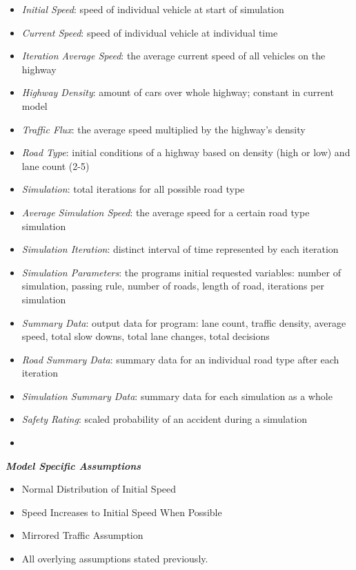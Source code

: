 \documentclass{amsart}
\begin{document}
\begin{itemize}
	\item \textit{Initial Speed}: speed of individual vehicle at start of simulation
	\item \textit{Current Speed}: speed of individual vehicle at individual time	
	\item \textit{Iteration Average Speed}: the average current speed of all vehicles on the highway
	\item \textit{Highway Density}: amount of cars over whole highway; constant in current model
	\item \textit{Traffic Flux}: the average speed multiplied by the highway's density
	\item \textit{Road Type}: initial conditions of a highway based on density (high or low) and lane count (2-5)
	\item \textit{Simulation}: total iterations for all possible road type	
	\item \textit{Average Simulation Speed}: the average speed for a certain road type simulation
	\item \textit{Simulation Iteration}: distinct interval of time represented by each iteration
	\item \textit{Simulation Parameters}: the programs initial requested variables: number of simulation, passing rule, number of roads, length of road, iterations per simulation
	\item \textit{Summary Data}: output data for program: lane count, traffic density, average speed, total slow downs, total lane changes, total decisions
	\item \textit{Road Summary Data}: summary data for an individual road type after each iteration
	\item \textit{Simulation Summary Data}: summary data for each simulation as a whole
	\item \textit{Safety Rating}: scaled probability of an accident during a simulation
	\item \
\end{itemize}
	
\textit{\textbf{Model Specific Assumptions}}

	\begin{itemize}
	\item Normal Distribution of Initial Speed
	\item Speed Increases to Initial Speed When Possible
	\item Mirrored Traffic Assumption	
	\item All overlying assumptions stated previously.
	
\end{itemize}
\end{document}
